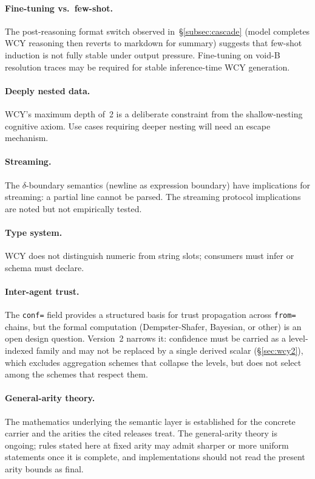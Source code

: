 \documentclass[11pt,a4paper]{article}
\begin{document}
\paragraph{Fine-tuning vs.\ few-shot.} The post-reasoning format switch observed in~\S\ref{subsec:cascade} (model completes WCY reasoning then reverts to markdown for summary) suggests that few-shot induction is not fully stable under output pressure. Fine-tuning on void-B resolution traces may be required for stable inference-time WCY generation.

\paragraph{Deeply nested data.} WCY's maximum depth of~2 is a deliberate constraint from the shallow-nesting cognitive axiom. Use cases requiring deeper nesting will need an escape mechanism.

\paragraph{Streaming.} The $\delta$-boundary semantics (newline as expression boundary) have implications for streaming: a partial line cannot be parsed. The streaming protocol implications are noted but not empirically tested.

\paragraph{Type system.} WCY does not distinguish numeric from string slots; consumers must infer or schema must declare.

\paragraph{Inter-agent trust.} The \texttt{conf=} field provides a structured basis for trust propagation across \texttt{from=} chains, but the formal computation (Dempster-Shafer, Bayesian, or other) is an open design question. Version~2 narrows it: confidence must be carried as a level-indexed family and may not be replaced by a single derived scalar (\S\ref{sec:wcy2}), which excludes aggregation schemes that collapse the levels, but does not select among the schemes that respect them.

\paragraph{General-arity theory.} The mathematics underlying the semantic layer is established for the concrete carrier and the arities the cited releases treat. The general-arity theory is ongoing; rules stated here at fixed arity may admit sharper or more uniform statements once it is complete, and implementations should not read the present arity bounds as final.
\end{document}
